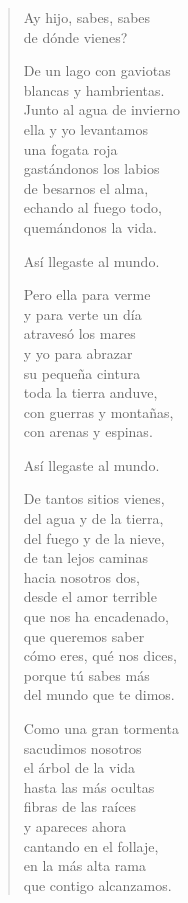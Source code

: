 \documentclass[12pt]{article}
\begin{document}
\clearpage
{}
\begin{verse}

Ay hijo, sabes, sabes\\
de dónde vienes?  

De un lago con gaviotas\\
blancas y hambrientas.\\
Junto al agua de invierno\\
ella y yo levantamos\\
una fogata roja\\
gastándonos los labios\\
de besarnos el alma,\\
echando al fuego todo,\\
quemándonos la vida.  

Así llegaste al mundo.  

Pero ella para verme\\
y para verte un día\\
atravesó los mares\\
y yo para abrazar\\
su pequeña cintura\\
toda la tierra anduve,\\
con guerras y montañas,\\
con arenas y espinas.  

Así llegaste al mundo.  

De tantos sitios vienes,\\
del agua y de la tierra,\\
del fuego y de la nieve,\\
de tan lejos caminas\\
hacia nosotros dos,\\
desde el amor terrible\\
que nos ha encadenado,\\
que queremos saber\\
cómo eres, qué nos dices,\\
porque tú sabes más\\
del mundo que te dimos.  

Como una gran tormenta\\
sacudimos nosotros\\
el árbol de la vida\\
hasta las más ocultas\\
fibras de las raíces\\
y apareces ahora\\
cantando en el follaje,\\
en la más alta rama\\
que contigo alcanzamos.  

\end{verse}
\end{document}
